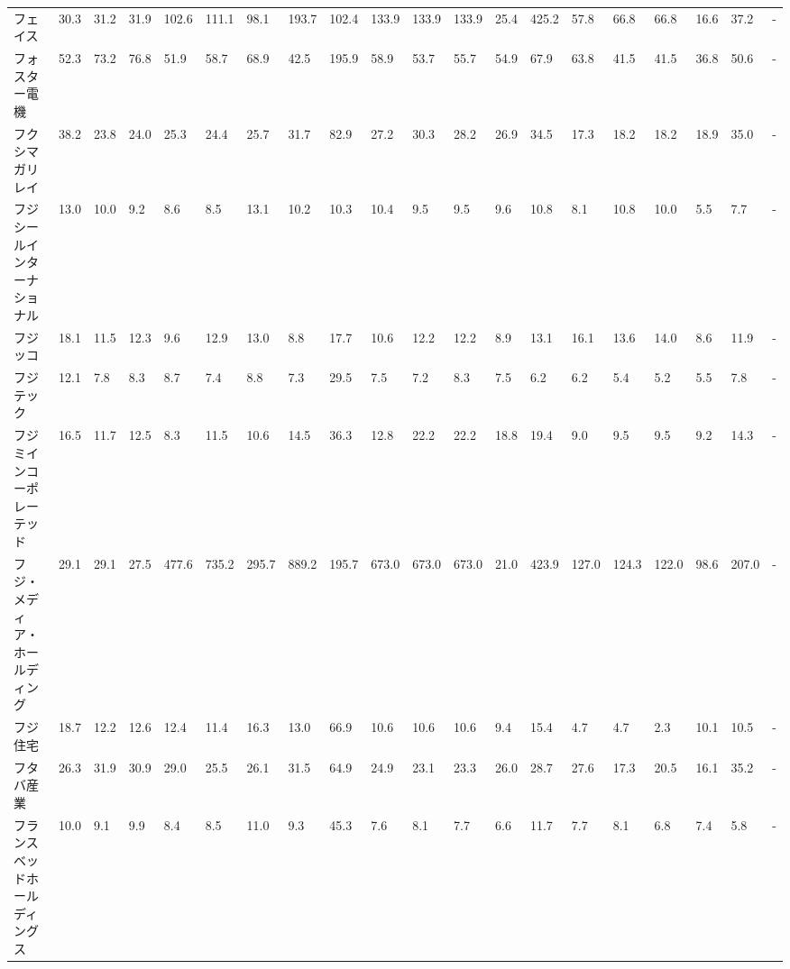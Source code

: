 \begin{tabular}{llllllllllllllllllll}
フェイス            &   30.3 &   31.2 &      31.9 &     102.6 &      111.1 &    98.1 &   193.7 &    102.4 &   133.9 &   133.9 &  133.9 &   25.4 &   425.2 &    57.8 &    66.8 &   66.8 &   16.6 &    37.2 &      - \\
フォスター電機         &   52.3 &   73.2 &      76.8 &      51.9 &       58.7 &    68.9 &    42.5 &    195.9 &    58.9 &    53.7 &   55.7 &   54.9 &    67.9 &    63.8 &    41.5 &   41.5 &   36.8 &    50.6 &      - \\
フクシマガリレイ        &   38.2 &   23.8 &      24.0 &      25.3 &       24.4 &    25.7 &    31.7 &     82.9 &    27.2 &    30.3 &   28.2 &   26.9 &    34.5 &    17.3 &    18.2 &   18.2 &   18.9 &    35.0 &      - \\
フジシールインターナショナル  &   13.0 &   10.0 &       9.2 &       8.6 &        8.5 &    13.1 &    10.2 &     10.3 &    10.4 &     9.5 &    9.5 &    9.6 &    10.8 &     8.1 &    10.8 &   10.0 &    5.5 &     7.7 &      - \\
フジッコ            &   18.1 &   11.5 &      12.3 &       9.6 &       12.9 &    13.0 &     8.8 &     17.7 &    10.6 &    12.2 &   12.2 &    8.9 &    13.1 &    16.1 &    13.6 &   14.0 &    8.6 &    11.9 &      - \\
フジテック           &   12.1 &    7.8 &       8.3 &       8.7 &        7.4 &     8.8 &     7.3 &     29.5 &     7.5 &     7.2 &    8.3 &    7.5 &     6.2 &     6.2 &     5.4 &    5.2 &    5.5 &     7.8 &      - \\
フジミインコーポレーテッド   &   16.5 &   11.7 &      12.5 &       8.3 &       11.5 &    10.6 &    14.5 &     36.3 &    12.8 &    22.2 &   22.2 &   18.8 &    19.4 &     9.0 &     9.5 &    9.5 &    9.2 &    14.3 &      - \\
フジ・メディア・ホールディング &   29.1 &   29.1 &      27.5 &     477.6 &      735.2 &   295.7 &   889.2 &    195.7 &   673.0 &   673.0 &  673.0 &   21.0 &   423.9 &   127.0 &   124.3 &  122.0 &   98.6 &   207.0 &      - \\
フジ住宅            &   18.7 &   12.2 &      12.6 &      12.4 &       11.4 &    16.3 &    13.0 &     66.9 &    10.6 &    10.6 &   10.6 &    9.4 &    15.4 &     4.7 &     4.7 &    2.3 &   10.1 &    10.5 &      - \\
フタバ産業           &   26.3 &   31.9 &      30.9 &      29.0 &       25.5 &    26.1 &    31.5 &     64.9 &    24.9 &    23.1 &   23.3 &   26.0 &    28.7 &    27.6 &    17.3 &   20.5 &   16.1 &    35.2 &      - \\
フランスベッドホールディングス &   10.0 &    9.1 &       9.9 &       8.4 &        8.5 &    11.0 &     9.3 &     45.3 &     7.6 &     8.1 &    7.7 &    6.6 &    11.7 &     7.7 &     8.1 &    6.8 &    7.4 &     5.8 &      - \\

\end{tabular}
